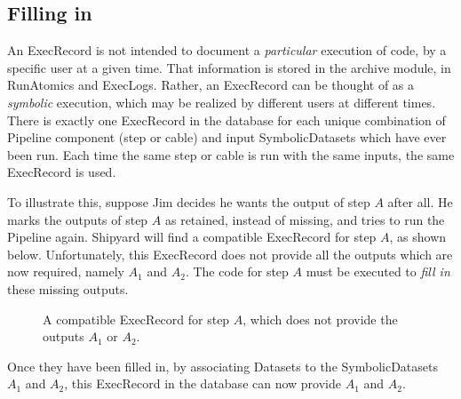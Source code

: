 \documentclass[12pt]{article}
\newcommand{\sd}{\bigcap} %
\newcommand{\sdd}{\bigcapdot} %
\begin{document}
\subsection*{Filling in}

An ExecRecord is not intended to document a \emph{particular} execution of
code, by a specific user at a given time. That information is stored in the
archive module, in RunAtomics and ExecLogs. Rather, an ExecRecord can be
thought of as a \emph{symbolic} execution, which may be realized by different
users at different times. There is exactly one ExecRecord in the database for
each unique combination of Pipeline component (step or cable) and input
SymbolicDatasets which have ever been run. Each time the same step or cable is
run with the same inputs, the same ExecRecord is used.

To illustrate this, suppose Jim decides he wants the output of step $A$ after
all. He marks the outputs of step $A$ as retained, instead of missing, and
tries to run the Pipeline again. Shipyard will find a compatible ExecRecord for
step $A$, as shown below. Unfortunately, this ExecRecord does not provide all
the outputs which are now required, namely $A_1$ and $A_2$. The code for step
$A$ must be executed to \emph{fill in} these missing outputs.

\begin{figure}[ht]
  \centering
  \caption{A compatible ExecRecord for step $A$, which does not provide the outputs $A_1$ or $A_2$.}
\end{figure}

Once they have been filled in, by associating Datasets to the SymbolicDatasets
$A_1$ and $A_2$, this ExecRecord in the database can now provide $A_1$ and
$A_2$. 
\end{document}
